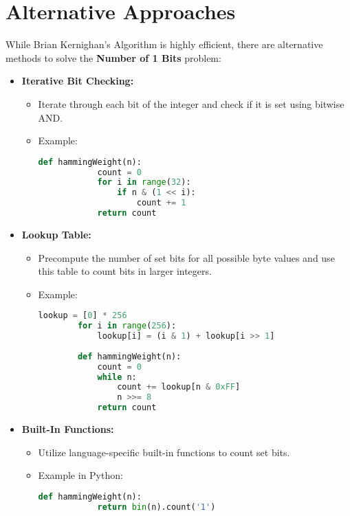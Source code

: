 \section*{Alternative Approaches}

While Brian Kernighan’s Algorithm is highly efficient, there are alternative methods to solve the \textbf{Number of 1 Bits} problem:

\begin{itemize}
    \item \textbf{Iterative Bit Checking:} 
    \begin{itemize}
        \item Iterate through each bit of the integer and check if it is set using bitwise AND.
        \item Example:
        \begin{lstlisting}[language=Python]
        def hammingWeight(n):
            count = 0
            for i in range(32):
                if n & (1 << i):
                    count += 1
            return count
        \end{lstlisting}
    \end{itemize}
    
    \item \textbf{Lookup Table:}
    \begin{itemize}
        \item Precompute the number of set bits for all possible byte values and use this table to count bits in larger integers.
        \item Example:
        \begin{lstlisting}[language=Python]
        lookup = [0] * 256
        for i in range(256):
            lookup[i] = (i & 1) + lookup[i >> 1]
        
        def hammingWeight(n):
            count = 0
            while n:
                count += lookup[n & 0xFF]
                n >>= 8
            return count
        \end{lstlisting}
    \end{itemize}
    
    \item \textbf{Built-In Functions:}
    \begin{itemize}
        \item Utilize language-specific built-in functions to count set bits.
        \item Example in Python:
        \begin{lstlisting}[language=Python]
        def hammingWeight(n):
            return bin(n).count('1')
        \end{lstlisting}
    \end{itemize}
\end{itemize}

